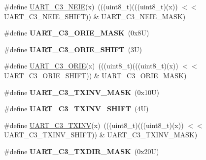 \begin{DoxyCompactItemize}
\#define \mbox{\hyperlink{group___u_a_r_t___register___masks_ga7582f63e07e8c9277c1b946740b7ae65}{U\+A\+R\+T\+\_\+\+C3\+\_\+\+N\+E\+IE}}(x)~(((uint8\+\_\+t)(((uint8\+\_\+t)(x)) $<$$<$ U\+A\+R\+T\+\_\+\+C3\+\_\+\+N\+E\+I\+E\+\_\+\+S\+H\+I\+FT)) \& U\+A\+R\+T\+\_\+\+C3\+\_\+\+N\+E\+I\+E\+\_\+\+M\+A\+SK)
\item 
\mbox{\label{group___u_a_r_t___register___masks_ga85999d87eca30c526580b0d060f2aff5}} 
\#define {\bfseries U\+A\+R\+T\+\_\+\+C3\+\_\+\+O\+R\+I\+E\+\_\+\+M\+A\+SK}~(0x8\+U)
\item 
\mbox{\label{group___u_a_r_t___register___masks_ga3e65d9370ba1e2d05042db7ed72e599b}} 
\#define {\bfseries U\+A\+R\+T\+\_\+\+C3\+\_\+\+O\+R\+I\+E\+\_\+\+S\+H\+I\+FT}~(3\+U)
\item 
\#define \mbox{\hyperlink{group___u_a_r_t___register___masks_ga04167af161829d23c6b8ab2a6a2a85d0}{U\+A\+R\+T\+\_\+\+C3\+\_\+\+O\+R\+IE}}(x)~(((uint8\+\_\+t)(((uint8\+\_\+t)(x)) $<$$<$ U\+A\+R\+T\+\_\+\+C3\+\_\+\+O\+R\+I\+E\+\_\+\+S\+H\+I\+FT)) \& U\+A\+R\+T\+\_\+\+C3\+\_\+\+O\+R\+I\+E\+\_\+\+M\+A\+SK)
\item 
\mbox{\label{group___u_a_r_t___register___masks_ga6c9c90706e66f4bfa8fb53dd0407e579}} 
\#define {\bfseries U\+A\+R\+T\+\_\+\+C3\+\_\+\+T\+X\+I\+N\+V\+\_\+\+M\+A\+SK}~(0x10\+U)
\item 
\mbox{\label{group___u_a_r_t___register___masks_ga99b840aeb5c25012354a1cd40ec35de7}} 
\#define {\bfseries U\+A\+R\+T\+\_\+\+C3\+\_\+\+T\+X\+I\+N\+V\+\_\+\+S\+H\+I\+FT}~(4\+U)
\item 
\#define \mbox{\hyperlink{group___u_a_r_t___register___masks_gaa6ad5229b8a54a92275e3b0df3e7fa34}{U\+A\+R\+T\+\_\+\+C3\+\_\+\+T\+X\+I\+NV}}(x)~(((uint8\+\_\+t)(((uint8\+\_\+t)(x)) $<$$<$ U\+A\+R\+T\+\_\+\+C3\+\_\+\+T\+X\+I\+N\+V\+\_\+\+S\+H\+I\+FT)) \& U\+A\+R\+T\+\_\+\+C3\+\_\+\+T\+X\+I\+N\+V\+\_\+\+M\+A\+SK)
\item 
\mbox{\label{group___u_a_r_t___register___masks_gae9909f5ed584e6647deec86775f025e7}} 
\#define {\bfseries U\+A\+R\+T\+\_\+\+C3\+\_\+\+T\+X\+D\+I\+R\+\_\+\+M\+A\+SK}~(0x20\+U)
\item 
\mbox{\label{group___u_a_r_t___register___masks_gafd8df440afc872879f09780112122e6a}} 
$$
\end{DoxyCompactItemize}

